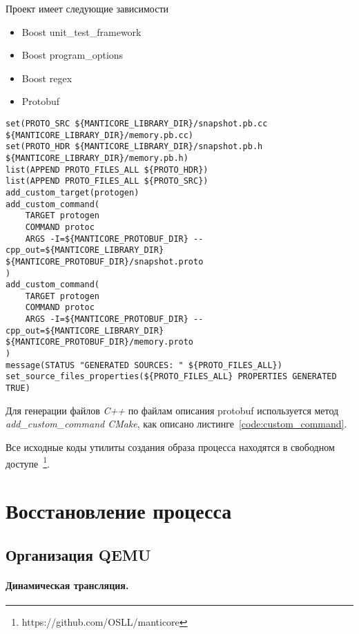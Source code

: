 Проект имеет следующие зависимости

\begin{itemize}

    \item Boost unit\_test\_framework
    \item Boost program\_options
    \item Boost regex
    \item Protobuf

\end{itemize}

\begin{lstlisting}[caption=Генерация исходных кодов по файлам описания protobuf, label=code:custom_command]
set(PROTO_SRC ${MANTICORE_LIBRARY_DIR}/snapshot.pb.cc ${MANTICORE_LIBRARY_DIR}/memory.pb.cc)
set(PROTO_HDR ${MANTICORE_LIBRARY_DIR}/snapshot.pb.h ${MANTICORE_LIBRARY_DIR}/memory.pb.h)
list(APPEND PROTO_FILES_ALL ${PROTO_HDR})
list(APPEND PROTO_FILES_ALL ${PROTO_SRC})
add_custom_target(protogen)
add_custom_command(
	TARGET protogen
	COMMAND protoc
	ARGS -I=${MANTICORE_PROTOBUF_DIR} --cpp_out=${MANTICORE_LIBRARY_DIR} ${MANTICORE_PROTOBUF_DIR}/snapshot.proto
)
add_custom_command(
	TARGET protogen
	COMMAND protoc
	ARGS -I=${MANTICORE_PROTOBUF_DIR} --cpp_out=${MANTICORE_LIBRARY_DIR} ${MANTICORE_PROTOBUF_DIR}/memory.proto
)
message(STATUS "GENERATED SOURCES: " ${PROTO_FILES_ALL})
set_source_files_properties(${PROTO_FILES_ALL} PROPERTIES GENERATED TRUE)
\end{lstlisting}

Для генерации файлов \textit{C++} по файлам описания protobuf используется метод \textit{add\_custom\_command CMake}, как описано листинге~\ref{code:custom_command}.

Все исходные коды утилиты создания образа процесса находятся в свободном доступе~\footnote{https://github.com/OSLL/manticore}.

\section{Восстановление процесса}

\subsection{Организация QEMU}

\paragraph{Динамическая трансляция.}\label{qemu_dynamic_translator}

